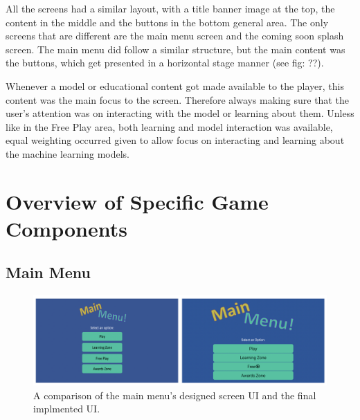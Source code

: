 	All the screens had a similar layout, with a title banner image at the top, the content in the middle and the buttons in the bottom general area. The only screens that are different are the main menu screen and the coming soon splash screen. The main menu did follow a similar structure, but the main content was the buttons, which get presented in a horizontal stage manner (see fig: ??).
	
	Whenever a model or educational content got made available to the player, this content was the main focus to the screen. Therefore always making sure that the user's attention was on interacting with the model or learning about them. Unless like in the Free Play area, both learning and model interaction was available, equal weighting occurred given to allow focus on interacting and learning about the machine learning models.
		
	
	
	
	
		
		
		
	\section{Overview of Specific Game Components}
		\label{sec:overview_game_components}
		
	
	\subsection{Main Menu}
	\begin{figure}[t]
		\includegraphics[width=15cm]{graphics/main_menu.png}
		\caption{A comparison of the main menu's designed screen UI and the final implmented UI.}
		\label{fig:ui_mm}
	\end{figure}
	
